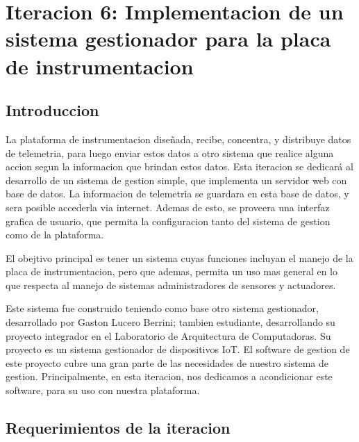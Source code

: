 \chapter{Iteracion 6: Implementacion de un sistema gestionador para la placa de instrumentacion} %
\label{cha:iteracion_6}

\section{Introduccion} %
\label{sec:introduccion}

La plataforma de instrumentacion diseñada, recibe, concentra, y distribuye datos de telemetria, para luego enviar estos datos a otro sistema que realice alguna accion segun la informacion que brindan estos datos. Esta iteracion se dedicará al desarrollo de un sistema de gestion simple, que implementa un servidor web con base de datos. La informacion de telemetria se guardara en esta base de datos, y sera posible accederla via internet. Ademas de esto, se proveera una interfaz grafica de usuario, que permita la configuracion tanto del sistema de gestion como de la plataforma.

El obejtivo principal es tener un sistema cuyas funciones incluyan el manejo de la placa de instrumentacion, pero que ademas, permita un uso mas general en lo que respecta al manejo de sistemas administradores de sensores y actuadores.

Este sistema fue construido teniendo como base otro sistema gestionador, desarrollado por Gaston Lucero Berrini; tambien estudiante, desarrollando su proyecto integrador en el Laboratorio de Arquitectura de Computadoras. Su proyecto es un sistema gestionador de dispositivos IoT. El software de gestion de este proyecto cubre una gran parte de las necesidades de nuestro sistema de gestion. Principalmente, en esta iteracion, nos dedicamos a acondicionar este software, para su uso con nuestra plataforma.


\section{Requerimientos de la iteracion} %
\label{sec:requerimientos_de_la_iteracion}

